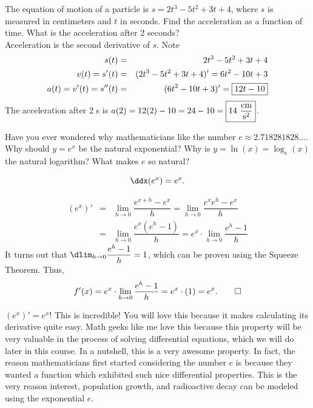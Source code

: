 \documentclass{book}
\begin{document}
\begin{Exam} The equation of motion of a particle is $s = 2t^3-5t^2+3t+4$, where $s$ is measured in centimeters and $t$ in seconds. Find the acceleration as a function of time. What is the acceleration after 2 seconds?\\

Acceleration is the second derivative of $s$. Note
\begin{eqnarray*}
s(t) &=& 2t^3-5t^2+3t+4\\
v(t)=s'(t) &=& (2t^3-5t^2+3t+4)' = 6t^2-10t+3\\
a(t)=v'(t)=s''(t) &=& (6t^2-10t+3)' = \fbox{$12t-10$}
\end{eqnarray*} The acceleration after 2 s is $a(2) = 12(2)-10 = 24-10 = \fbox{$14\ \dfrac{\text{cm}}{\text{s}^2}$}$.
\end{Exam}\vs

Have you ever wondered why mathematicians like the number $e \approx 2.718281828\ldots$. Why should $y=e^x$ be the natural exponential? Why is $y = \ln(x) = \log_e(x)$ the natural logarithm? What makes $e$ so natural?

\begin{Thm}[Derivative of $e^x$]\label{e} \[\ddx(e^x) = e^x.\]\end{Thm}
\begin{pf} \mbox{}\vspace{-30pt}

\begin{eqnarray*} 
(e^x)' &=& \lim_{h\to 0} \dfrac{e^{x+h}-e^x}{h} = \lim_{h\to 0} \dfrac{e^{x}e^{h}-e^x}{h}\\
&=& \lim_{h\to 0} \dfrac{e^{x}(e^{h}-1)}{h} = e^x\cdot \lim_{h\to 0} \dfrac{e^{h}-1}{h}
\end{eqnarray*} It turns out that $\dlim_{h\to 0} \dfrac{e^h-1}{h}= 1$, which can be proven using the Squeeze Theorem. Thus, \[f'(x) = e^x\cdot \lim_{h\to 0} \dfrac{e^{h}-1}{h} = e^x\cdot(1) = e^x. \qedhere\]
\end{pf}\vs

$(e^x)' = e^x!$ This is incredible! You will love this because it makes calculating its derivative quite easy. Math geeks like me love this because this property will be very valuable in the process of solving differential equations, which we will do later in this course. In a nutshell, this is a very awesome property. In fact, the reason mathematicians first started considering the number $e$  is because they wanted a function which exhibited such nice differential properties. This is the very reason interest, population growth, and radioactive decay can be modeled using the exponential $e$.
\end{document}

